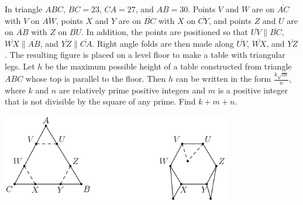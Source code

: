 In triangle $ABC$, $BC = 23$, $CA = 27$, and $AB = 30$.  Points $V$ and $W$ are on $\overline{AC}$ with $V$ on $\overline{AW}$, points $X$ and $Y$ are on $\overline{BC}$ with $X$ on $\overline{CY}$, and points $Z$ and $U$ are on $\overline{AB}$ with $Z$ on $\overline{BU}$.  In addition, the points are positioned so that $\overline{UV} \parallel \overline{BC}$, $\overline{WX} \parallel \overline{AB}$, and $\overline{YZ} \parallel \overline{CA}$.  Right angle folds are then made along $\overline{UV}$, $\overline{WX}$, and $\overline{YZ}$.  The resulting figure is placed on a level floor to make a table with triangular legs.  Let $h$ be the maximum possible height of a table constructed from triangle $ABC$ whose top is parallel to the floor.  Then $h$ can be written in the form $\tfrac{k \sqrt{m}}{n}$, where $k$ and $n$ are relatively prime positive integers and $m$ is a positive integer that is not divisible by the square of any prime.  Find $k + m + n$.

\begin{center}
\includegraphics[width = 100.4mm]{img/fig0.png}
\end{center}